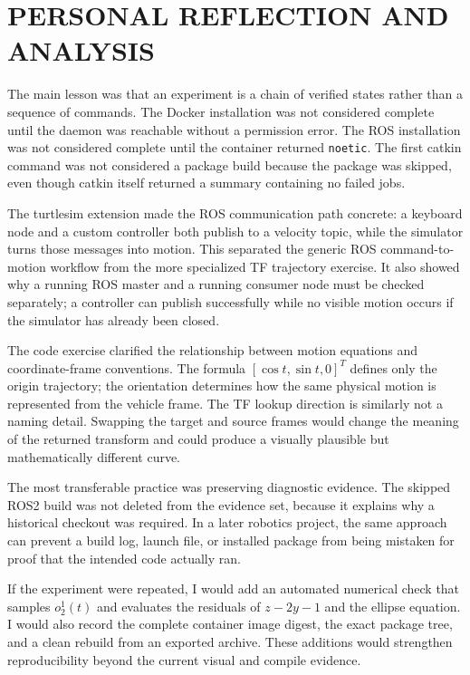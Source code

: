 \documentclass[letterpaper, 10 pt, conference]{ieeeconf}
\begin{document}
\section{PERSONAL REFLECTION AND ANALYSIS}
\label{sec:reflection}
The main lesson was that an experiment is a chain of verified states rather than a sequence of commands. The Docker installation was not considered complete until the daemon was reachable without a permission error. The ROS installation was not considered complete until the container returned \texttt{noetic}. The first catkin command was not considered a package build because the package was skipped, even though catkin itself returned a summary containing no failed jobs.

The turtlesim extension made the ROS communication path concrete: a keyboard node and a custom controller both publish to a velocity topic, while the simulator turns those messages into motion. This separated the generic ROS command-to-motion workflow from the more specialized TF trajectory exercise. It also showed why a running ROS master and a running consumer node must be checked separately; a controller can publish successfully while no visible motion occurs if the simulator has already been closed.

The code exercise clarified the relationship between motion equations and coordinate-frame conventions. The formula \([\cos t,\sin t,0]^T\) defines only the origin trajectory; the orientation determines how the same physical motion is represented from the vehicle frame. The TF lookup direction is similarly not a naming detail. Swapping the target and source frames would change the meaning of the returned transform and could produce a visually plausible but mathematically different curve.

The most transferable practice was preserving diagnostic evidence. The skipped ROS2 build was not deleted from the evidence set, because it explains why a historical checkout was required. In a later robotics project, the same approach can prevent a build log, launch file, or installed package from being mistaken for proof that the intended code actually ran.

If the experiment were repeated, I would add an automated numerical check that samples \(o_2^1(t)\) and evaluates the residuals of \(z-2y-1\) and the ellipse equation. I would also record the complete container image digest, the exact package tree, and a clean rebuild from an exported archive. These additions would strengthen reproducibility beyond the current visual and compile evidence.
\end{document}
